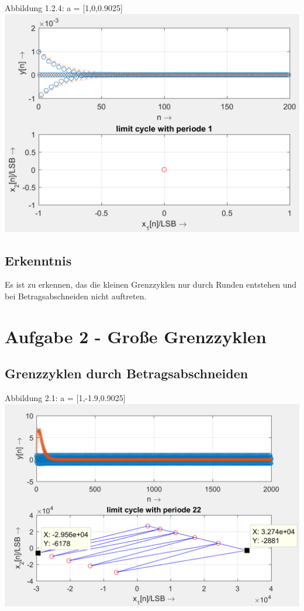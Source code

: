 \begin{center}
Abbildung 1.2.4: a = [1,0,0.9025]\\
\includegraphics[scale=0.9]{../Tab2_4.PNG}
\end{center}

\subsection{Erkenntnis}

Es ist zu erkennen, das die kleinen Grenzzyklen nur durch Runden entstehen und bei Betragsabschneiden nicht auftreten.

\newpage

\section{Aufgabe 2 - Große Grenzzyklen}

\subsection{Grenzzyklen durch Betragsabschneiden}

\begin{center}
Abbildung 2.1: a = [1,-1.9,0.9025]\\
\includegraphics[scale=0.9]{../Tab3_1.PNG}
\end{center}

